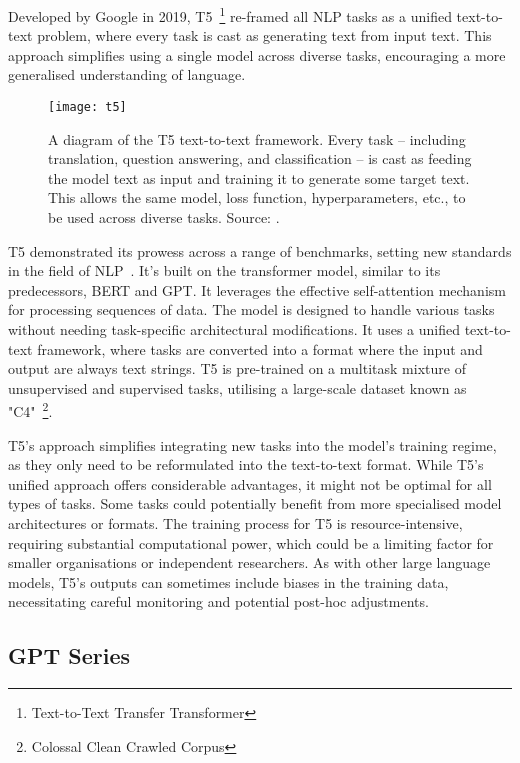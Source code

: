 Developed by Google in 2019, T5~\footnote{Text-to-Text Transfer Transformer} re-framed all NLP tasks as a unified text-to-text problem, where every task is cast as generating text from input text.
This approach simplifies using a single model across diverse tasks, encouraging a more generalised understanding of language.

\begin{figure}[h!]
	\centering
	\texttt{[image: t5]}
	\caption{A diagram of the T5 text-to-text framework. Every task -- including translation, question answering, and classification -- is cast as feeding the model text as input and training it to generate some target text. This allows the same model, loss function, hyperparameters, etc., to be used across diverse tasks. Source: \protect\textcite{raffel2023exploring}.}
	\label{fig:t5-t2t}
\end{figure}

T5 demonstrated its prowess across a range of benchmarks, setting new standards in the field of NLP~\cite{raffel2023exploring}.
It's built on the transformer model, similar to its predecessors, BERT and GPT. It leverages the effective self-attention mechanism for processing sequences of data.
The model is designed to handle various tasks without needing task-specific architectural modifications.
It uses a unified text-to-text framework, where tasks are converted into a format where the input and output are always text strings.
T5 is pre-trained on a multitask mixture of unsupervised and supervised tasks, utilising a large-scale dataset known as "C4"~\footnote{Colossal Clean Crawled Corpus}.

T5's approach simplifies integrating new tasks into the model's training regime, as they only need to be reformulated into the text-to-text format.
While T5's unified approach offers considerable advantages, it might not be optimal for all types of tasks.
Some tasks could potentially benefit from more specialised model architectures or formats.
The training process for T5 is resource-intensive, requiring substantial computational power, which could be a limiting factor for smaller organisations or independent researchers.
As with other large language models, T5's outputs can sometimes include biases in the training data, necessitating careful monitoring and potential post-hoc adjustments.

\subsection{GPT Series}
\label{subsec:gpt-series}

